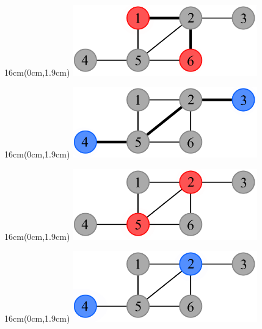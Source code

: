 \documentclass[xcolor=dvipsnames,aspectratio=1610]{beamer}
\newcommand{\exampleheight}{1.9cm}
\newcommand{\examplewidth}{16cm}
\begin{document}
\begin{frame}
     {
      \begin{textblock*}{\examplewidth}(0cm,\exampleheight) %
        \centering
        \includegraphics[width=8cm]{../figures/example-dist-1.pdf}
      \end{textblock*}
    }

     {
      \begin{textblock*}{\examplewidth}(0cm,\exampleheight) %
        \centering
        \includegraphics[width=8cm]{../figures/example-dist-2.pdf}
      \end{textblock*}
    }

     {
      \begin{textblock*}{\examplewidth}(0cm,\exampleheight) %
        \centering
        \includegraphics[width=8cm]{../figures/example-dom-1.pdf}
      \end{textblock*}
    }

     {
      \begin{textblock*}{\examplewidth}(0cm,\exampleheight) %
        \centering
        \includegraphics[width=8cm]{../figures/example-dom-2.pdf}
      \end{textblock*}
    }


\end{frame}
\end{document}
